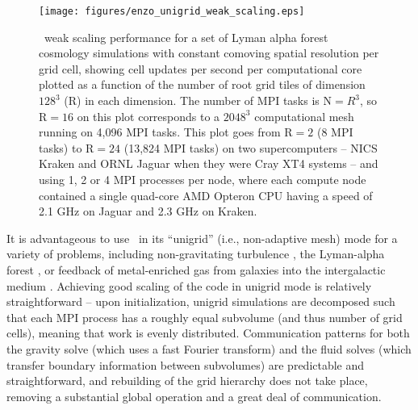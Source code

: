 \begin{figure}
\begin{center}
\texttt{[image: figures/enzo\_unigrid\_weak\_scaling.eps]}
\caption{\enzo\ weak scaling performance for a set of Lyman alpha
forest cosmology simulations with constant comoving spatial resolution
per grid cell, showing cell updates per second per computational core
plotted as a function of the number of root grid tiles of dimension
$128^3$ (R) in each dimension.  The number of MPI tasks is N$ = R^3$,
so R$ = 16$ on this plot corresponds to a $2048^3$ computational mesh
running on 4,096 MPI tasks.  This plot goes from R$ = 2$ (8 MPI tasks)
to R$ = 24$ (13,824 MPI tasks) on two supercomputers -- NICS Kraken
and ORNL Jaguar when they were Cray XT4 systems -- and using 1, 2 or 4
MPI processes per node, where each compute node contained a single
quad-core AMD Opteron CPU having a speed of 2.1 GHz on Jaguar and 2.3
GHz on Kraken.}
\label{fig.uniscale}
\end{center}
\end{figure}

It is advantageous to use \enzo\ in its ``unigrid'' (i.e.,
non-adaptive mesh) mode for a variety of problems, including
non-gravitating turbulence
\citep[e.g.,][]{2002ApJ...569L.127K,Kritsuk04}, the Lyman-alpha forest
\citep{2005MNRAS.361...70J,2009MNRAS.399.1934P}, or feedback of
metal-enriched gas from galaxies into the intergalactic medium
\citep{2004ApJ...601L.115N,2011ApJ...731....6S}.  Achieving good
scaling of the code in unigrid mode is relatively straightforward --
upon initialization, unigrid simulations are decomposed such that each
MPI process has a roughly equal subvolume (and thus number of grid
cells), meaning that work is evenly distributed.  Communication
patterns for both the gravity solve (which uses a fast Fourier
transform) and the fluid solves (which transfer boundary information
between subvolumes) are predictable and straightforward, and
rebuilding of the grid hierarchy does not take place, removing a
substantial global operation and a great deal of communication.


